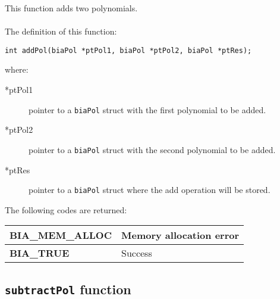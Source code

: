 This function adds two polynomials.\\ \\
%
The definition of this function:
%
\begin{verbatim}
int addPol(biaPol *ptPol1, biaPol *ptPol2, biaPol *ptRes);  
\end{verbatim}
%
where:
%
\begin{description}
\item[*ptPol1] pointer to a \texttt{biaPol} struct with the first polynomial to be added.
\item[*ptPol2] pointer to a \texttt{biaPol} struct with the second polynomial to be added.
\item[*ptRes] pointer to a \texttt{biaPol} struct where the add operation will be stored.
\end{description}
%
The following codes are returned:
%
\begin{center}
\begin{tabular}{|l|l|}
\hline
\textbf{BIA\_MEM\_ALLOC} & Memory allocation error \\
\hline
\textbf{BIA\_TRUE} & Success \\
\hline
\end{tabular}
\end{center}
%
%

\subsection{\texttt{subtractPol} function}

